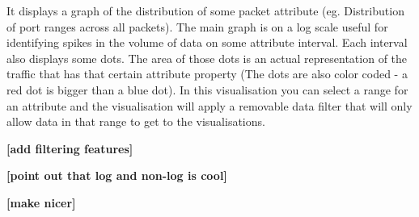 It displays a graph of the distribution of some packet attribute (eg. Distribution of port ranges across all packets). 
The main graph is on a log scale useful for identifying spikes in the volume of data on some attribute interval. 
Each interval also displays some dots. The area of those dots is an actual representation of the traffic that has that certain attribute property (The dots are also color coded - a red dot is bigger than a blue dot). 
In this visualisation you can select a range for an attribute and the visualisation will apply a removable data filter that will only allow data in that range to get to the visualisations.

\textbf{[add filtering features]}

\textbf{[point out that log and non-log is cool]}

\textbf{[make nicer]}